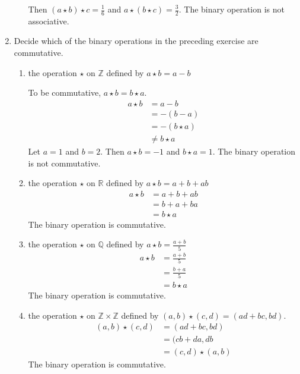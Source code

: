 \begin{enumerate}
\begin{enumerate}[label = (\alph*)]
    Then \((a\star b)\star c = \frac{1}{6}\) and
    \(a\star (b\star c) = \frac{3}{2}\).
    The binary operation is not associative.
  \end{enumerate}
\item
  Decide which of the binary operations in the preceding exercise are
  commutative.
  \begin{enumerate}[label = (\alph*)]
  \item
    the operation \(\star\) on \(\mathbb{Z}\) defined by
    \(a\star b = a - b\)
    \par\smallskip
    To be commutative, \(a\star b = b\star a\).
    \begin{align*}
      a\star b & = a - b\\
               & = -(b - a)\\
               & = -(b\star a)\\
               & \neq b\star a
    \end{align*}
    Let \(a = 1\) and \(b = 2\).
    Then \(a\star b = -1\) and \(b\star a = 1\).
    The binary operation is not commutative.
  \item
    the operation \(\star\) on \(\mathbb{R}\) defined by
    \(a\star b = a + b + ab\)
    \begin{align*}
      a\star b & = a + b + ab\\
               & = b + a + ba\\
               & = b\star a
    \end{align*}
    The binary operation is commutative.
  \item
    the operation \(\star\) on \(\mathbb{Q}\) defined by
    \(a\star b = \frac{a + b}{5}\)
    \begin{align*}
      a\star b & = \frac{a + b}{5}\\
               & = \frac{b + a}{5}\\
               & = b\star a
    \end{align*}
    The binary operation is commutative.
  \item
    the operation \(\star\) on \(\mathbb{Z}\times\mathbb{Z}\) defined by
    \((a, b)\star (c, d) = (ad + bc, bd)\).
    \begin{align*}
      (a, b)\star (c, d) & = (ad + bc, bd)\\
                         & = (cb + da, db\\
                         & = (c, d)\star (a, b)
    \end{align*}
    The binary operation is commutative.

\end{enumerate}
\end{enumerate}
